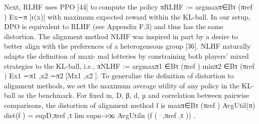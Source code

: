 \documentclass[10pt]{article}
\begin{document}
\begin{ReviewVerbatim}
Next, RLHF uses PPO [44] to compute the policy πRLHF := argmaxπ∈Bτ (πref ) Ex∼π [r(x)] with
maximum expected reward within the KL-ball. In our setup, DPO is equivalent to RLHF (see
Appendix F.3) and thus has the same distortion.
The alignment method NLHF was inspired in part by a desire to better align with the
preferences of a heterogeneous group [36]. NLHF naturally adapts the definition of maxi-
mal lotteries by constraining both players’ mixed strategies to the KL-ball, i.e., πNLHF :=
argmaxπ1 ∈Bτ (πref ) minπ2 ∈Bτ (πref ) Ex1 ∼π1 ,x2 ∼π2 [Mx1 ,x2 ].
To generalize the definition of distortion to alignment methods, we set the maximum average utility of
any policy in the KL-ball as the benchmark. For fixed m, D, β, d, µ and correlation between pairwise
comparisons, the distortion of alignment method f is
                                                             maxπ∈Bτ (πref ) AvgUtil(π)
                      dist(f ) = supD,πref ,τ lim supn→∞       AvgUtiln (f (·,πref ,τ )) .
\end{ReviewVerbatim}
\end{document}
